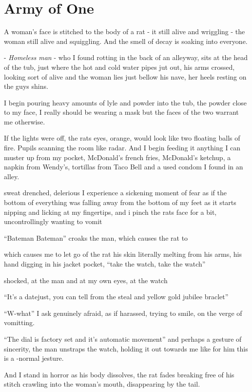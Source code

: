 \documentclass[19pt,openany]{book}
\begin{document}
\chapter{Army of One}

A woman's face is stitched to the body of a rat -
it still alive and wriggling - the woman
still alive and squiggling. And the smell
of decay is soaking into everyone.

- \textit{Homeless man} - who I found rotting in the back
of an alleyway, sits at the head of the tub, just
where the hot and cold water pipes jut out, his
arms crossed, looking sort of alive and the
woman lies just bellow his nave, her heels resting
on the guys shins.

I begin pouring heavy amounts of lyle and powder
into the tub, the powder close to my face,
I really should be wearing a mask but the faces of the two warrant me otherwise.

If the lights were off, the rats eyes, orange,
would look like two floating balls of fire. Pupils scanning
the room like radar.
And I begin feeding it anything I can muster up from my pocket,
McDonald's french fries, McDonald's ketchup, a napkin from Wendy's,
tortillas from Taco Bell and a used condom I found in an alley.

sweat drenched, delerious
I experience a sickening moment of fear as if
the bottom of everything was falling away from the bottom of my
feet as it starts nipping and licking at my fingertips, and i pinch
the rats face for a bit, uncontrollingly wanting to vomit

``Bateman Bateman''
croaks the man, which
causes the rat to

which causes me
to let go of the rat his skin literally melting from his arms, his
hand digging in his jacket pocket, ``take the watch, take the watch''

shocked, at the man and at my own eyes, at the watch

``It's a datejust, you can
tell from the steal and
yellow gold jubilee braclet''

``W-what'' I ask genuinely afraid, as if harassed, trying
to smile, on the verge of vomitting.

``The dial is factory set and it's automatic movement''
and perhaps a gesture of sincerity, the man unstraps the
watch, holding it out towards me like for him this is a -normal
jesture.

And I stand in horror as his body dissolves, the rat fades
breaking free of his stitch crawling into the woman's mouth,
disappearing by the tail.
\end{document}
